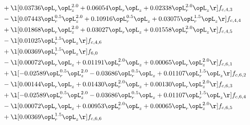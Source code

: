 \begin{alignat}{2}
& + \l[  0.03736 \opL_r \opL_z^{2.0} +  0.06054 \opL_r \opL_z +  0.02338 \opL_r^{2.0} \opL_z  \r] f_{c,4,3} \nonumber \\ 
& - \l[  0.07443 \opL_r^{0.5} \opL_z^{2.0} +  0.10916 \opL_r^{0.5} \opL_z +  0.03075 \opL_r^{1.5} \opL_z  \r] f_{c,4,4} \nonumber \\ 
& + \l[  0.01868 \opL_r \opL_z^{2.0} +  0.03027 \opL_r \opL_z +  0.01558 \opL_r^{2.0} \opL_z  \r] f_{c,4,5} \nonumber \\ 
& - \l[  0.01025 \opL_r^{1.5} \opL_z  \r] f_{c,4,6} \nonumber \\ 
& + \l[  0.00369 \opL_r^{1.5} \opL_z  \r] f_{6,0} \nonumber \\ 
& - \l[  0.00072 \opL_r \opL_z +  0.01191 \opL_r^{2.0} \opL_z +  0.00065 \opL_r \opL_z^{2.0}  \r] f_{c,6,1} \nonumber \\ 
& + \l[  -0.02589 \opL_r^{0.5} \opL_z^{2.0}   -0.03686 \opL_r^{0.5} \opL_z +  0.01107 \opL_r^{1.5} \opL_z  \r] f_{c,6,2} \nonumber \\ 
& - \l[  0.00144 \opL_r \opL_z +  0.01430 \opL_r^{2.0} \opL_z +  0.00130 \opL_r \opL_z^{2.0}  \r] f_{c,6,3} \nonumber \\ 
& + \l[  -0.02589 \opL_r^{0.5} \opL_z^{2.0}   -0.03686 \opL_r^{0.5} \opL_z +  0.01107 \opL_r^{1.5} \opL_z  \r] f_{c,6,4} \nonumber \\ 
& - \l[  0.00072 \opL_r \opL_z +  0.00953 \opL_r^{2.0} \opL_z +  0.00065 \opL_r \opL_z^{2.0}  \r] f_{c,6,5} \nonumber \\ 
& + \l[  0.00369 \opL_r^{1.5} \opL_z  \r] f_{c,6,6} \nonumber \\ 
\end{alignat} 


